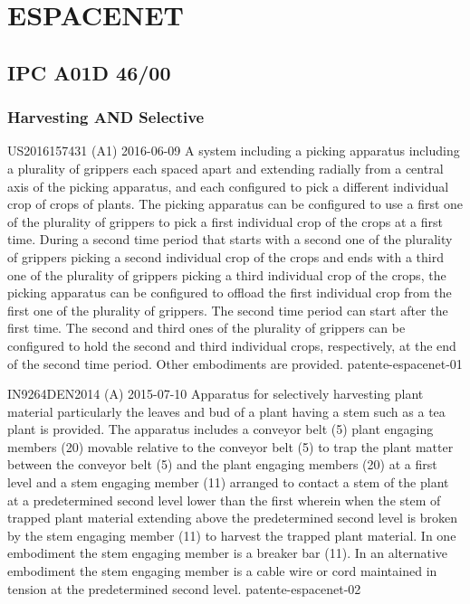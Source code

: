 
\chapter{ESPACENET}
\label{chap:espacenet}

\section{IPC A01D 46/00}
\label{sec:ipc-a01d-4600}

\subsection{Harvesting AND Selective}
\label{sec:harvesting-selective}


{US2016157431 (A1)}%
{2016-06-09}%
{A system including a picking apparatus including a plurality of grippers each
  spaced apart and extending radially from a central axis of the picking
  apparatus, and each configured to pick a different individual crop of crops of
  plants. The picking apparatus can be configured to use a first one of the
  plurality of grippers to pick a first individual crop of the crops at a first
  time. During a second time period that starts with a second one of the
  plurality of grippers picking a second individual crop of the crops and ends
  with a third one of the plurality of grippers picking a third individual crop
  of the crops, the picking apparatus can be configured to offload the first
  individual crop from the first one of the plurality of grippers. The second
  time period can start after the first time. The second and third ones of the
  plurality of grippers can be configured to hold the second and third
  individual crops, respectively, at the end of the second time period. Other
  embodiments are provided.}%
{patente-espacenet-01}%

{IN9264DEN2014 (A)}%
{2015-07-10}%
{Apparatus for selectively harvesting plant material particularly the leaves and
  bud of a plant having a stem such as a tea plant is provided.  The apparatus
  includes a conveyor belt (5) plant engaging members (20) movable relative to
  the conveyor belt (5) to trap the plant matter between the conveyor belt (5)
  and the plant engaging members (20) at a first level and a stem engaging
  member (11) arranged to contact a stem of the plant at a predetermined second
  level lower than the first wherein when the stem of trapped plant material
  extending above the predetermined second level is broken by the stem engaging
  member (11) to harvest the trapped plant material. In one embodiment the stem
  engaging member is a breaker bar (11). In an alternative embodiment the stem
  engaging member is a cable wire or cord maintained in tension at the
  predetermined second level.}%
{patente-espacenet-02}%

